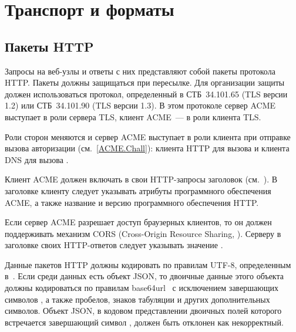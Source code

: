 \section{Транспорт и форматы}\label{ACME.Transport}

\subsection{Пакеты HTTP}\label{ACME.Transport.HTTP}

Запросы на веб-узлы и ответы с них представляют собой пакеты
протокола HTTP. Пакеты должны защищаться при пересылке. Для организации защиты 
должен использоваться протокол, определенный в СТБ~34.101.65 (TLS версии 1.2) 
или СТБ~34.101.90 (TLS версии 1.3). В этом протоколе сервер ACME выступает в роли 
сервера TLS, клиент ACME~--- в роли клиента TLS.


Роли сторон меняются и сервер ACME выступает в роли клиента при отправке 
вызова авторизации (см.~\ref{ACME.Chall}): клиента HTTP для вызова
 и клиента DNS для вызова .


Клиент ACME должен включать в свои HTTP-запросы заголовок 
(см.~\cite{HTTP}). В заголовке клиенту следует указывать атрибуты программного 
обеспечения ACME, а также название и версию программного обеспечения HTTP.

Если сервер ACME разрешает доступ браузерных клиентов, то он должен поддерживать 
механизм CORS (Cross-Origin Resource Sharing, \cite{CORS}). Серверу в 
заголовке  своих HTTP-ответов следует 
указывать значение \sstr{*}.

Данные пакетов HTTP должны кодировать по правилам UTF-8,
определенным в~\cite{UTF8}. 
%
Если среди данных есть объект JSON, то двоичные данные этого объекта
должны кодироваться по правилам base64url~\cite{RFC4648} с исключением
завершающих символов \str{=}, а также пробелов, знаков табуляции и других 
дополнительных символов.
%
Объект JSON, в кодовом представлении двоичных полей которого  
встречается завершающий символ \str{=}, должен быть отклонен как 
некорректный.

